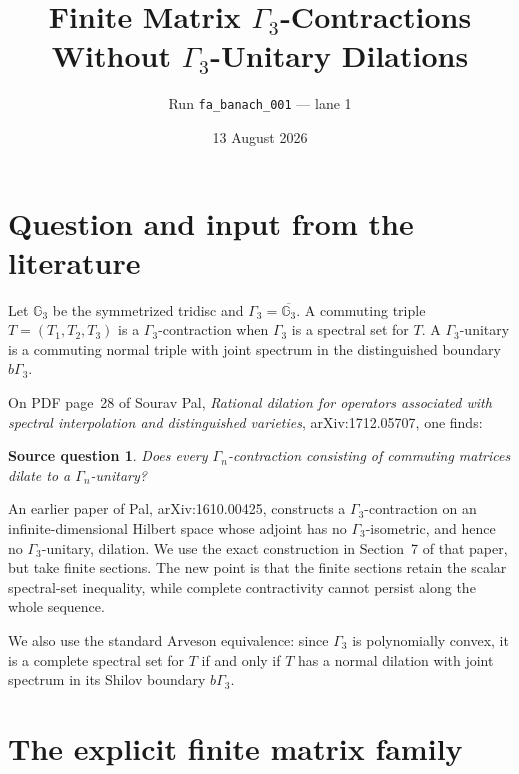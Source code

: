 \documentclass[11pt]{article}
\title{Finite Matrix $\Gamma_3$-Contractions\\Without $\Gamma_3$-Unitary Dilations}
\author{Run \texttt{fa\_banach\_001} --- lane 1}
\date{13 August 2026}
\newtheorem*{sourcequestion}{Source question}
\newcommand{\G}{\Gamma_3}
\newcommand{\bG}{b\Gamma_3}
\begin{document}
\maketitle

\begin{center}
\end{center}

\section{Question and input from the literature}

Let $\mathbb G_3$ be the symmetrized tridisc and $\G=\overline{\mathbb
G_3}$.  A commuting triple $T=(T_1,T_2,T_3)$ is a $\G$-contraction when
$\G$ is a spectral set for $T$.  A $\G$-unitary is a commuting normal
triple with joint spectrum in the distinguished boundary $\bG$.

On PDF page~28 of Sourav Pal, \emph{Rational dilation for operators
associated with spectral interpolation and distinguished varieties},
arXiv:1712.05707, one finds:

\begin{sourcequestion}
Does every $\Gamma_n$-contraction consisting of commuting matrices dilate
to a $\Gamma_n$-unitary?
\end{sourcequestion}

An earlier paper of Pal, arXiv:1610.00425, constructs a $\G$-contraction
on an infinite-dimensional Hilbert space whose adjoint has no
$\G$-isometric, and hence no $\G$-unitary, dilation.  We use the exact
construction in Section~7 of that paper, but take finite sections.  The
new point is that the finite sections retain the scalar spectral-set
inequality, while complete contractivity cannot persist along the whole
sequence.

We also use the standard Arveson equivalence: since $\G$ is polynomially
convex, it is a complete spectral set for $T$ if and only if $T$ has a
normal dilation with joint spectrum in its Shilov boundary $\bG$.

\section{The explicit finite matrix family}
\end{document}
